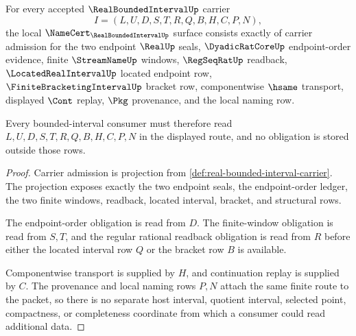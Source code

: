 \begin{theorem}
\label{thm:real-bounded-interval-namecert-obligations}
For every accepted $\RealBoundedIntervalUp$ carrier
$$
I=(L,U,D,S,T,R,Q,B,H,C,P,N),
$$
the local $\NameCert_{\RealBoundedIntervalUp}$ surface consists exactly of carrier admission for the two endpoint $\RealUp$ seals, $\DyadicRatCoreUp$ endpoint-order evidence, finite $\StreamNameUp$ windows, $\RegSeqRatUp$ readback, $\LocatedRealIntervalUp$ located endpoint row, $\FiniteBracketingIntervalUp$ bracket row, componentwise $\hsame$ transport, displayed $\Cont$ replay, $\Pkg$ provenance, and the local naming row.

Every bounded-interval consumer must therefore read $L,U,D,S,T,R,Q,B,H,C,P,N$ in the displayed route, and no obligation is stored outside those rows.
\end{theorem}
\begin{proof}
Carrier admission is projection from \autoref{def:real-bounded-interval-carrier}. The projection exposes exactly the two endpoint seals, the endpoint-order ledger, the two finite windows, readback, located interval, bracket, and structural rows.

The endpoint-order obligation is read from $D$. The finite-window obligation is read from $S,T$, and the regular rational readback obligation is read from $R$ before either the located interval row $Q$ or the bracket row $B$ is available.

Componentwise transport is supplied by $H$, and continuation replay is supplied by $C$. The provenance and local naming rows $P,N$ attach the same finite route to the packet, so there is no separate host interval, quotient interval, selected point, compactness, or completeness coordinate from which a consumer could read additional data.
\end{proof}

